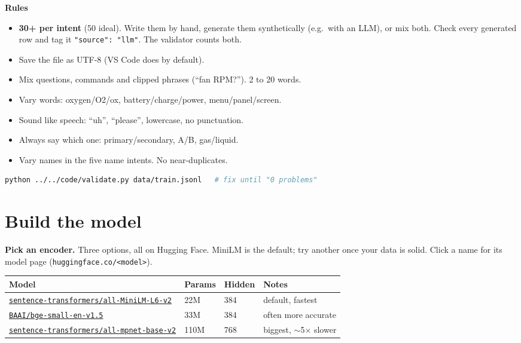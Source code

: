 \documentclass[11pt]{article}
\begin{document}
\textbf{Rules}
\begin{itemize}
  \item \textbf{30+ per intent} (50 ideal). Write them by hand, generate
        them synthetically (e.g.\ with an LLM), or mix both. Check every
        generated row and tag it \texttt{"source": "llm"}. The validator counts both.
  \item Save the file as UTF-8 (VS Code does by default).
  \item Mix questions, commands and clipped phrases (``fan RPM?''). 2 to 20 words.
  \item Vary words: oxygen/O2/ox, battery/charge/power, menu/panel/screen.
  \item Sound like speech: ``uh'', ``please'', lowercase, no punctuation.
  \item Always say which one: primary/secondary, A/B, gas/liquid.
  \item Vary names in the five name intents. No near-duplicates.
\end{itemize}



\begin{lstlisting}[language=bash]
python ../../code/validate.py data/train.jsonl   # fix until "0 problems"
\end{lstlisting}

\newpage
\section{Build the model}

\textbf{Pick an encoder.} Three options, all on Hugging Face. MiniLM is the
default; try another once your data is solid. Click a name for its model page
(\texttt{huggingface.co/<model>}).

\begin{center}
\small
\begin{tabular}{@{}llll@{}}
\toprule
Model & Params & Hidden & Notes \\
\midrule
\href{https://huggingface.co/sentence-transformers/all-MiniLM-L6-v2}{\texttt{sentence-transformers/all-MiniLM-L6-v2}} & 22M & 384 & default, fastest \\
\href{https://huggingface.co/BAAI/bge-small-en-v1.5}{\texttt{BAAI/bge-small-en-v1.5}} & 33M & 384 & often more accurate \\
\href{https://huggingface.co/sentence-transformers/all-mpnet-base-v2}{\texttt{sentence-transformers/all-mpnet-base-v2}} & 110M & 768 & biggest, $\sim$5$\times$ slower \\
\bottomrule
\end{tabular}
\end{center}
\end{document}

